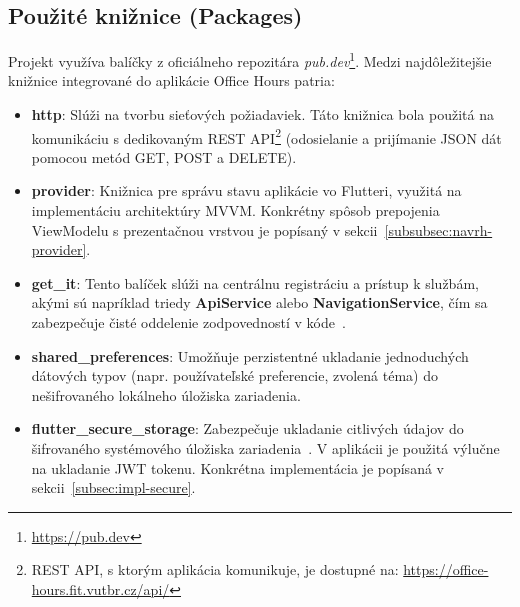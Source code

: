 \subsection{Použité knižnice (Packages)}
Projekt využíva balíčky z oficiálneho repozitára \textit{pub.dev}\footnote{\url{https://pub.dev}}. Medzi najdôležitejšie knižnice integrované do aplikácie Office Hours patria:

\begin{itemize}
    \item \textbf{http}: Slúži na tvorbu sieťových požiadaviek. Táto knižnica bola použitá na komunikáciu s dedikovaným REST API\footnote{REST API, s ktorým aplikácia komunikuje, je dostupné na:
\url{https://office-hours.fit.vutbr.cz/api/}} (odosielanie a prijímanie JSON dát pomocou metód GET, POST a DELETE).
    \item \textbf{provider}: Knižnica pre správu stavu aplikácie vo Flutteri,
    využitá na implementáciu architektúry MVVM. Konkrétny spôsob prepojenia
    ViewModelu s prezentačnou vrstvou je popísaný v sekcii~\ref{subsubsec:navrh-provider}.
    \item \textbf{get\_it}: Tento balíček slúži na centrálnu registráciu a prístup k službám, akými sú napríklad triedy \textbf{ApiService} alebo \textbf{NavigationService}, čím sa zabezpečuje čisté oddelenie zodpovedností v kóde~\cite{getit}.
    \item \textbf{shared\_preferences}: Umožňuje perzistentné ukladanie jednoduchých dátových typov (napr. používateľské preferencie, zvolená téma) do nešifrovaného lokálneho úložiska zariadenia.
    \item \textbf{flutter\_secure\_storage}: Zabezpečuje ukladanie citlivých údajov
    do šifrovaného systémového úložiska zariadenia~\cite{fluttersecurestorage}.
    V aplikácii je použitá výlučne na ukladanie JWT tokenu. Konkrétna implementácia je popísaná v sekcii~\ref{subsec:impl-secure}.
\end{itemize}

